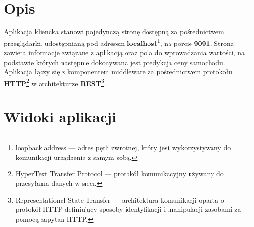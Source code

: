 \documentclass[12pt, a4paper]{report}
\begin{document}
\section{Opis}
Aplikacja kliencka stanowi pojedynczą stronę dostępną za pośrednictwem przeglądarki,
udostępnianą pod adresem \textbf{localhost}\footnote{loopback address --- adres pętli zwrotnej, który jest wykorzystywany do komunikacji urządzenia z samym sobą.},
na porcie \textbf{9091}. Strona zawiera informacje związane z aplikacją oraz pola do wprowadzania wartości,
na podstawie których następnie dokonywana jest predykcja ceny samochodu. Aplikacja łączy się z komponentem
middleware za pośrednictwem protokołu \textbf{HTTP}\footnote{HyperText Transfer Protocol --- protokół komunikacyjny używany do przesyłania danych w sieci.}
 w architekturze 
\textbf{REST}\footnote{Representational State Transfer --- architektura komunikacji oparta o protokół HTTP
    definiujący sposoby identyfikacji i manipulacji zasobami za pomocą zapytań HTTP.}.\@
\section{Widoki aplikacji}
\end{document}
